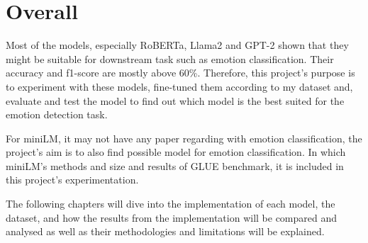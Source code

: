  \section{Overall}

 Most of the models, especially RoBERTa, Llama2 and GPT-2 shown that they might be suitable for downstream task such as emotion classification. Their accuracy and f1-score are mostly above 60\%. Therefore, this project's purpose is to experiment with these models, fine-tuned them according to my dataset and, evaluate and test the model to find out which model is the best suited for the emotion detection task.

 For miniLM, it may not have any paper regarding with emotion classification, the project's aim is to also find possible model for emotion classification. In which miniLM's methods and size and results of GLUE benchmark, it is included in this project's experimentation.
 
The following chapters will dive into the implementation of each model, the dataset, and how the results from the implementation will be compared and analysed as well as their methodologies and limitations will be explained.
